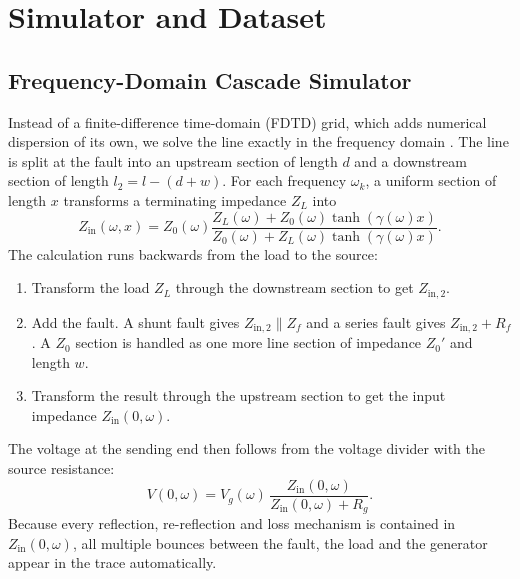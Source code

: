 \section{Simulator and Dataset}
\label{sec:simulation}

\subsection{Frequency-Domain Cascade Simulator}
Instead of a finite-difference time-domain (FDTD) grid, which adds numerical dispersion of its own, we solve the line exactly in the frequency domain \cite{pozar2011microwave}. The line is split at the fault into an upstream section of length $d$ and a downstream section of length $l_2 = l - (d + w)$. For each frequency $\omega_k$, a uniform section of length $x$ transforms a terminating impedance $Z_L$ into
\begin{equation}
Z_{\mathrm{in}}(\omega, x) = Z_0(\omega) \frac{Z_L(\omega) + Z_0(\omega) \tanh(\gamma(\omega) x)}{Z_0(\omega) + Z_L(\omega) \tanh(\gamma(\omega) x)} .
\label{eq:zin_transform}
\end{equation}
The calculation runs backwards from the load to the source:
\begin{enumerate}
    \item Transform the load $Z_L$ through the downstream section to get $Z_{\mathrm{in},2}$.
    \item Add the fault. A shunt fault gives $Z_{\mathrm{in},2} \parallel Z_f$ and a series fault gives $Z_{\mathrm{in},2} + R_f$. A $Z_0$ section is handled as one more line section of impedance $Z_0'$ and length $w$.
    \item Transform the result through the upstream section to get the input impedance $Z_{\mathrm{in}}(0,\omega)$.
\end{enumerate}
The voltage at the sending end then follows from the voltage divider with the source resistance:
\begin{equation}
V(0, \omega) = V_g(\omega) \, \frac{Z_{\mathrm{in}}(0, \omega)}{Z_{\mathrm{in}}(0, \omega) + R_g} .
\label{eq:v_terminal}
\end{equation}
Because every reflection, re-reflection and loss mechanism is contained in $Z_{\mathrm{in}}(0,\omega)$, all multiple bounces between the fault, the load and the generator appear in the trace automatically.

